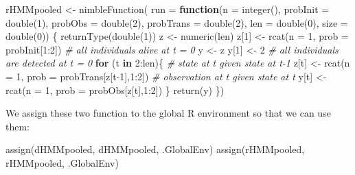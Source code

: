 \documentclass[
  12pt,
]{krantz}
\newenvironment{Shaded}{\begin{snugshade}}{\end{snugshade}}
\newcommand{\AttributeTok}[1]{\textcolor[rgb]{0.77,0.63,0.00}{#1}}
\newcommand{\CommentTok}[1]{\textcolor[rgb]{0.56,0.35,0.01}{\textit{#1}}}
\newcommand{\ControlFlowTok}[1]{\textcolor[rgb]{0.13,0.29,0.53}{\textbf{#1}}}
\newcommand{\DecValTok}[1]{\textcolor[rgb]{0.00,0.00,0.81}{#1}}
\newcommand{\FunctionTok}[1]{\textcolor[rgb]{0.00,0.00,0.00}{#1}}
\newcommand{\NormalTok}[1]{#1}
\newcommand{\OtherTok}[1]{\textcolor[rgb]{0.56,0.35,0.01}{#1}}
\newcommand{\SpecialCharTok}[1]{\textcolor[rgb]{0.00,0.00,0.00}{#1}}
\newcommand{\StringTok}[1]{\textcolor[rgb]{0.31,0.60,0.02}{#1}}
\begin{document}
\begin{Shaded}
\begin{Highlighting}[]
\NormalTok{rHMMpooled }\OtherTok{\textless{}{-}} \FunctionTok{nimbleFunction}\NormalTok{(}
  \AttributeTok{run =} \ControlFlowTok{function}\NormalTok{(}\AttributeTok{n =} \FunctionTok{integer}\NormalTok{(),}
                 \AttributeTok{probInit =} \FunctionTok{double}\NormalTok{(}\DecValTok{1}\NormalTok{),}
                 \AttributeTok{probObs =} \FunctionTok{double}\NormalTok{(}\DecValTok{2}\NormalTok{),}
                 \AttributeTok{probTrans =} \FunctionTok{double}\NormalTok{(}\DecValTok{2}\NormalTok{),}
                 \AttributeTok{len =} \FunctionTok{double}\NormalTok{(}\DecValTok{0}\NormalTok{),}
                 \AttributeTok{size =} \FunctionTok{double}\NormalTok{(}\DecValTok{0}\NormalTok{)) \{}
    \FunctionTok{returnType}\NormalTok{(}\FunctionTok{double}\NormalTok{(}\DecValTok{1}\NormalTok{))}
\NormalTok{    z }\OtherTok{\textless{}{-}} \FunctionTok{numeric}\NormalTok{(len)}
\NormalTok{    z[}\DecValTok{1}\NormalTok{] }\OtherTok{\textless{}{-}} \FunctionTok{rcat}\NormalTok{(}\AttributeTok{n =} \DecValTok{1}\NormalTok{, }\AttributeTok{prob =}\NormalTok{ probInit[}\DecValTok{1}\SpecialCharTok{:}\DecValTok{2}\NormalTok{]) }\CommentTok{\# all individuals alive at t = 0}
\NormalTok{    y }\OtherTok{\textless{}{-}}\NormalTok{ z}
\NormalTok{    y[}\DecValTok{1}\NormalTok{] }\OtherTok{\textless{}{-}} \DecValTok{2} \CommentTok{\# all individuals are detected at t = 0}
    \ControlFlowTok{for}\NormalTok{ (t }\ControlFlowTok{in} \DecValTok{2}\SpecialCharTok{:}\NormalTok{len)\{}
      \CommentTok{\# state at t given state at t{-}1}
\NormalTok{      z[t] }\OtherTok{\textless{}{-}} \FunctionTok{rcat}\NormalTok{(}\AttributeTok{n =} \DecValTok{1}\NormalTok{, }\AttributeTok{prob =}\NormalTok{ probTrans[z[t}\DecValTok{{-}1}\NormalTok{],}\DecValTok{1}\SpecialCharTok{:}\DecValTok{2}\NormalTok{]) }
      \CommentTok{\# observation at t given state at t}
\NormalTok{      y[t] }\OtherTok{\textless{}{-}} \FunctionTok{rcat}\NormalTok{(}\AttributeTok{n =} \DecValTok{1}\NormalTok{, }\AttributeTok{prob =}\NormalTok{ probObs[z[t],}\DecValTok{1}\SpecialCharTok{:}\DecValTok{2}\NormalTok{]) }
\NormalTok{    \}}
    \FunctionTok{return}\NormalTok{(y)}
\NormalTok{  \})}
\end{Highlighting}
\end{Shaded}

We assign these two function to the global R environment so that we can use them:

\begin{Shaded}
\begin{Highlighting}[]
\FunctionTok{assign}\NormalTok{(}\StringTok{\textquotesingle{}dHMMpooled\textquotesingle{}}\NormalTok{, dHMMpooled, .GlobalEnv)}
\FunctionTok{assign}\NormalTok{(}\StringTok{\textquotesingle{}rHMMpooled\textquotesingle{}}\NormalTok{, rHMMpooled, .GlobalEnv)}
\end{Highlighting}
\end{Shaded}
\end{document}
